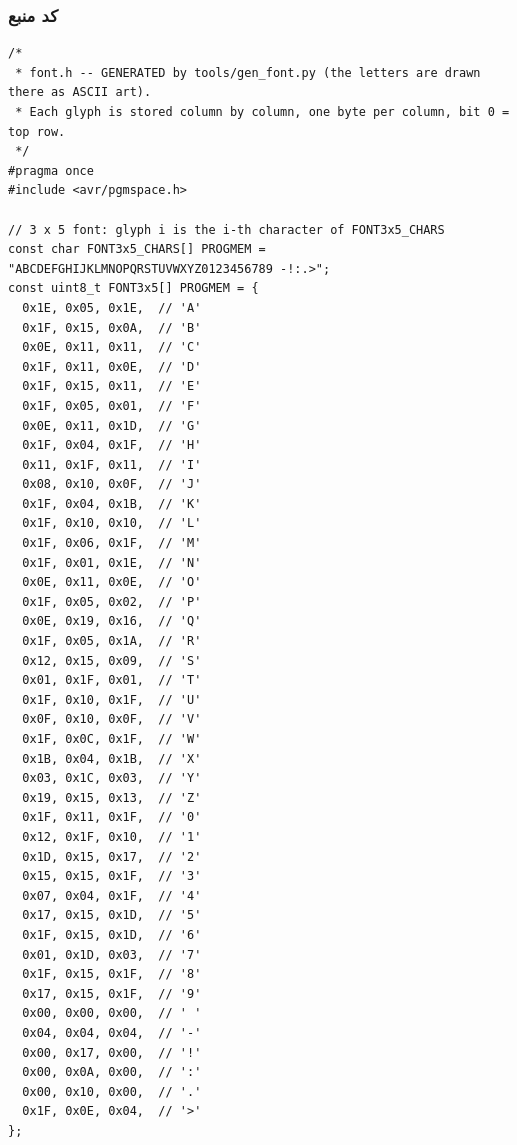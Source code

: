 \documentclass[11pt,a4paper]{article}
\begin{document}
\subsubsection*{کد منبع}
\begin{latin}
\begin{lstlisting}[language=Arduino]
/*
 * font.h -- GENERATED by tools/gen_font.py (the letters are drawn there as ASCII art).
 * Each glyph is stored column by column, one byte per column, bit 0 = top row.
 */
#pragma once
#include <avr/pgmspace.h>

// 3 x 5 font: glyph i is the i-th character of FONT3x5_CHARS
const char FONT3x5_CHARS[] PROGMEM = "ABCDEFGHIJKLMNOPQRSTUVWXYZ0123456789 -!:.>";
const uint8_t FONT3x5[] PROGMEM = {
  0x1E, 0x05, 0x1E,  // 'A'
  0x1F, 0x15, 0x0A,  // 'B'
  0x0E, 0x11, 0x11,  // 'C'
  0x1F, 0x11, 0x0E,  // 'D'
  0x1F, 0x15, 0x11,  // 'E'
  0x1F, 0x05, 0x01,  // 'F'
  0x0E, 0x11, 0x1D,  // 'G'
  0x1F, 0x04, 0x1F,  // 'H'
  0x11, 0x1F, 0x11,  // 'I'
  0x08, 0x10, 0x0F,  // 'J'
  0x1F, 0x04, 0x1B,  // 'K'
  0x1F, 0x10, 0x10,  // 'L'
  0x1F, 0x06, 0x1F,  // 'M'
  0x1F, 0x01, 0x1E,  // 'N'
  0x0E, 0x11, 0x0E,  // 'O'
  0x1F, 0x05, 0x02,  // 'P'
  0x0E, 0x19, 0x16,  // 'Q'
  0x1F, 0x05, 0x1A,  // 'R'
  0x12, 0x15, 0x09,  // 'S'
  0x01, 0x1F, 0x01,  // 'T'
  0x1F, 0x10, 0x1F,  // 'U'
  0x0F, 0x10, 0x0F,  // 'V'
  0x1F, 0x0C, 0x1F,  // 'W'
  0x1B, 0x04, 0x1B,  // 'X'
  0x03, 0x1C, 0x03,  // 'Y'
  0x19, 0x15, 0x13,  // 'Z'
  0x1F, 0x11, 0x1F,  // '0'
  0x12, 0x1F, 0x10,  // '1'
  0x1D, 0x15, 0x17,  // '2'
  0x15, 0x15, 0x1F,  // '3'
  0x07, 0x04, 0x1F,  // '4'
  0x17, 0x15, 0x1D,  // '5'
  0x1F, 0x15, 0x1D,  // '6'
  0x01, 0x1D, 0x03,  // '7'
  0x1F, 0x15, 0x1F,  // '8'
  0x17, 0x15, 0x1F,  // '9'
  0x00, 0x00, 0x00,  // ' '
  0x04, 0x04, 0x04,  // '-'
  0x00, 0x17, 0x00,  // '!'
  0x00, 0x0A, 0x00,  // ':'
  0x00, 0x10, 0x00,  // '.'
  0x1F, 0x0E, 0x04,  // '>'
};


\end{lstlisting}
\end{latin}
\end{document}
